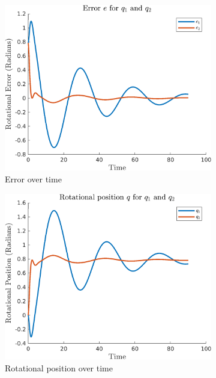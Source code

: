 \documentclass{article}
\begin{document}
\begin{figure}[H]
    \centering
    \begin{subfigure}{0.325\textwidth}
        \centering
        \includegraphics[width = \textwidth]{figures/error-b3.png}
        \caption{Error over time}
    \end{subfigure}
    \begin{subfigure}{0.325\textwidth}
        \centering
        \includegraphics[width = \textwidth]{figures/rotational-position-b3.png}
        \caption{Rotational position over time}
    \end{subfigure}
    \begin{subfigure}{0.325\textwidth}

\end{subfigure}
\end{figure}
\end{document}
